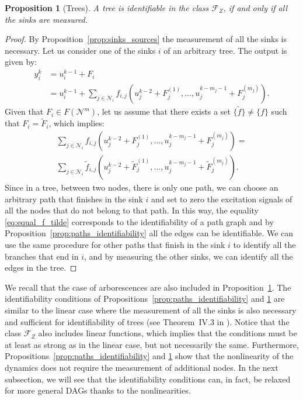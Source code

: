 \documentclass[letterpaper,10pt,journal]{IEEEtran}
\newcommand{\Fone}{\mathcal{F}_Z}
\newtheorem{proposition}{Proposition}
\newcommand{\NN}{\mathcal{N}}
\begin{document}
\begin{proposition}[Trees]\label{prop:trees_identifiability}
A tree is identifiable in the class $\Fone$, if and only if all the sinks are measured.
\end{proposition}
\begin{proof}
    By Proposition~\ref{prop:sinks_sources} the measurement of all the sinks is necessary.
    Let us consider one of the sinks $i$ of an arbitrary tree. The output is given by:
    \begin{align}
        y_i^k&=u_i^{k-1}+F_i\nonumber\\
        &=u_i^{k-1}\!+\!\sum_{j\in\NN_i}\!f_{i,j}(u_{j}^{k-2}\!+\!F_{j}^{(1)},\ldots,u_{j}^{k-m_{j}-1}\!+\!F_{j}^{(m_{j})}).\label{eq:branches_tree}
    \end{align}
    Given that $F_i\in F(\NN^m)$, let us assume that there exists a set $\{\tilde f\}\neq \{ f\}$ such that $F_i=\tilde F_i$, which implies:
    \begin{multline}\label{eq:equal_f_tilde}
        \sum_{j\in\NN_i}f_{i,j}(u_{j}^{k-2}+F_{j}^{(1)},\ldots,u_{j}^{k-m_{j}-1}+F_{j}^{(m_{j})})=\\
        \sum_{j\in\NN_i}\tilde f_{i,j}(u_{j}^{k-2}+\tilde F_{j}^{(1)},\ldots,u_{j}^{k-m_{j}-1}+\tilde F_{j}^{(m_{j})}).
    \end{multline}
    Since in a tree, between two nodes, there is only one path, we can choose an arbitrary path that finishes in the sink $i$ and set to zero the excitation signals of all the nodes that do not belong to that path. In this way, the equality \eqref{eq:equal_f_tilde} corresponds to the identifiability of a path graph and by Proposition~\ref{prop:paths_identifiability} all the edges can be identifiable. We can use the same procedure for other paths that finish in the sink $i$ to identify all the branches that end in $i$, and by measuring the other sinks, we can identify all the edges in the tree.
\end{proof}

We recall that the case of arborescences are also included in Proposition~\ref{prop:trees_identifiability}. The identifiability conditions of Propositions~\ref{prop:paths_identifiability} and \ref{prop:trees_identifiability} are similar to the linear case where the measurement of all the sinks is also necessary and sufficient for identifiability of trees (see Theorem~IV.3 in \cite{hendrickx2019identifiability}). 
Notice that the class $\Fone$ also includes linear functions, which implies that the conditions must be at least as strong as in the linear case, but not necessarily the same.
Furthermore, Propositions~\ref{prop:paths_identifiability} and \ref{prop:trees_identifiability} show that the nonlinearity of the dynamics does not require the measurement of additional nodes. In the next subsection, we will see that the identifiability conditions can, in fact, be relaxed for more general DAGs thanks to the nonlinearities.
\end{document}
